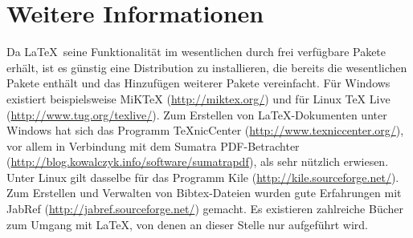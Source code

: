\section{Weitere Informationen}
Da \LaTeX\ seine Funktionalität im wesentlichen durch frei verfügbare Pakete erhält, ist es günstig eine Distribution zu installieren, die bereits die wesentlichen Pakete enthält und das Hinzufügen weiterer Pakete vereinfacht. Für Windows existiert beispielsweise MiKTeX (\url{http://miktex.org/}) und für Linux TeX Live (\url{http://www.tug.org/texlive/}). Zum Erstellen von \LaTeX-Dokumenten unter Windows hat sich das Programm TeXnicCenter (\url{http://www.texniccenter.org/}), vor allem in Verbindung mit dem Sumatra PDF-Betrachter (\url{http://blog.kowalczyk.info/software/sumatrapdf}), als sehr nützlich erwiesen. Unter Linux gilt dasselbe für das Programm Kile (\url{http://kile.sourceforge.net/}). Zum Erstellen und Verwalten von Bibtex-Dateien wurden gute Erfahrungen mit JabRef (\url{http://jabref.sourceforge.net/}) gemacht. Es existieren zahlreiche Bücher zum Umgang mit \LaTeX, von denen an dieser Stelle nur \cite{MittelbachGoosens05} aufgeführt wird.
